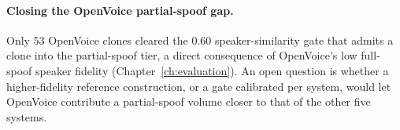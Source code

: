 \documentclass[11pt]{report}
\begin{document}
\paragraph{Closing the OpenVoice partial-spoof gap.} Only
53 OpenVoice clones cleared the 0.60 speaker-similarity gate that admits
a clone into the partial-spoof tier, a direct consequence of OpenVoice's
low full-spoof speaker fidelity (Chapter~\ref{ch:evaluation}). An open
question is whether a higher-fidelity reference construction, or a gate
calibrated per system, would let OpenVoice contribute a partial-spoof
volume closer to that of the other five systems.


\end{document}
